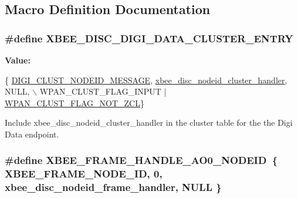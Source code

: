 \subsection{Macro Definition Documentation}
\hypertarget{group__xbee__discovery_ga8f678e29b22812632df7d3fa3d0f951a}{
\subsubsection[{X\-B\-E\-E\-\_\-\-D\-I\-S\-C\-\_\-\-D\-I\-G\-I\-\_\-\-D\-A\-T\-A\-\_\-\-C\-L\-U\-S\-T\-E\-R\-\_\-\-E\-N\-T\-R\-Y}]{\setlength{\rightskip}{0pt plus 5cm}\#define X\-B\-E\-E\-\_\-\-D\-I\-S\-C\-\_\-\-D\-I\-G\-I\-\_\-\-D\-A\-T\-A\-\_\-\-C\-L\-U\-S\-T\-E\-R\-\_\-\-E\-N\-T\-R\-Y}}\label{group__xbee__discovery_ga8f678e29b22812632df7d3fa3d0f951a}
{\bfseries Value\-:}
\begin{DoxyCode}
\{ \hyperlink{group__wpan__aps_gga1227ab13b41d82d9c9c9080662f74cf7ad19431fd18576cc8463e8ac362a8579c}{DIGI\_CLUST\_NODEID\_MESSAGE}, 
      \hyperlink{group__xbee__discovery_ga20bc82e8efc243e295c99c23948bed3b}{xbee\_disc\_nodeid\_cluster\_handler}, NULL, \(\backslash\)
      WPAN\_CLUST\_FLAG\_INPUT | \hyperlink{group__wpan__aps_gacb0e365a8c5e72ee90be503513e7e630}{WPAN\_CLUST\_FLAG\_NOT\_ZCL}\}
\end{DoxyCode}


Include xbee\-\_\-disc\-\_\-nodeid\-\_\-cluster\-\_\-handler in the cluster table for the the Digi Data endpoint. 

\hypertarget{group__xbee__discovery_ga11002dcf6525c8a0d1144215bebbc774}{
\subsubsection[{X\-B\-E\-E\-\_\-\-F\-R\-A\-M\-E\-\_\-\-H\-A\-N\-D\-L\-E\-\_\-\-A\-O0\-\_\-\-N\-O\-D\-E\-I\-D}]{\setlength{\rightskip}{0pt plus 5cm}\#define X\-B\-E\-E\-\_\-\-F\-R\-A\-M\-E\-\_\-\-H\-A\-N\-D\-L\-E\-\_\-\-A\-O0\-\_\-\-N\-O\-D\-E\-I\-D~\{ {\bf X\-B\-E\-E\-\_\-\-F\-R\-A\-M\-E\-\_\-\-N\-O\-D\-E\-\_\-\-I\-D}, 0, {\bf xbee\-\_\-disc\-\_\-nodeid\-\_\-frame\-\_\-handler}, N\-U\-L\-L \}}}\label{group__xbee__discovery_ga11002dcf6525c8a0d1144215bebbc774}


